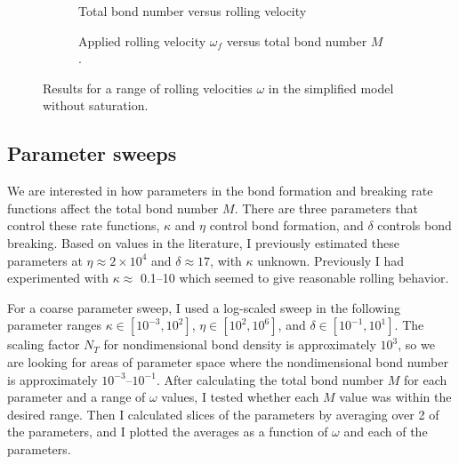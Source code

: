 \documentclass{article}
\begin{document}
\begin{figure}
  \centering
  \begin{subfigure}{.48\linewidth}
    \caption{Total bond number versus rolling velocity}
    \label{fig:om-vs-T-M}
  \end{subfigure}
  \hfill
  \begin{subfigure}{.49\linewidth}
    \caption{Applied rolling velocity $\omega_f$ versus total bond
      number $M$.}
    \label{fig:omf-om-M}
  \end{subfigure}
  \caption{Results for a range of rolling velocities $\omega$ in the
    simplified model without saturation.}
  \label{fig:char-results1}
\end{figure}

\subsection{Parameter sweeps}
\label{sec:parameter-sweeps}

We are interested in how parameters in the bond formation and breaking
rate functions affect the total bond number $M$. There are three
parameters that control these rate functions, $\kappa$ and $\eta$
control bond formation, and $\delta$ controls bond breaking. Based on
values in the literature, I previously estimated these parameters at
$\eta \approx 2 \times 10^4$ and $\delta \approx 17$, with $\kappa$
unknown. Previously I had experimented with $\kappa \approx $ 0.1--10
which seemed to give reasonable rolling behavior.

For a coarse parameter sweep, I used a log-scaled sweep in the
following parameter ranges $\kappa \in [10^{-3}, 10^{2}]$, $\eta \in
[10^2, 10^6]$, and $\delta \in [10^{-1}, 10^1]$. The scaling factor $N_T$
for nondimensional bond density is approximately $10^3$, so we are
looking for areas of parameter space where the nondimensional bond
number is approximately $10^{-3}$--$10^{-1}$. After calculating the total
bond number $M$ for each parameter and a range of $\omega$ values, I
tested whether each $M$ value was within the desired range. Then I
calculated slices of the parameters by averaging over 2 of the
parameters, and I plotted the averages as a function of $\omega$ and
each of the parameters.
\end{document}
